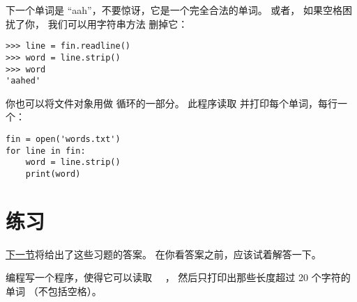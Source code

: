下一个单词是 ``aah''，不要惊讶，它是一个完全合法的单词。
或者， 如果空格困扰了你， 我们可以用字符串方法  删掉它：
  
  


\begin{lstlisting}
>>> line = fin.readline()
>>> word = line.strip()
>>> word
'aahed'
\end{lstlisting}


你也可以将文件对象用做  循环的一部分。
此程序读取  并打印每个单词，每行一个：
  

\begin{lstlisting}
fin = open('words.txt')
for line in fin:
    word = line.strip()
    print(word)
\end{lstlisting}

%
\section{练习}


\hyperref[search]{下一节}将给出了这些习题的答案。
在你看答案之前，应该试着解答一下。

\begin{exercise}

编程写一个程序，使得它可以读取 　， 然后只打印出那些长度超过 20 个字符的单词 （不包括空格）。

\end{exercise}

